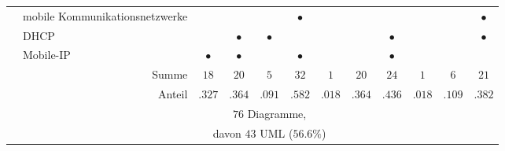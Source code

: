 \begin{mytable}
\begin{center}
\begin{longtable}{c|p{1.7cm}|ccccc|cc|cc|c}
			\multirow{3}{*}{\rotatebox{90}{$\leftarrow$~U12}} & {\raggedright mobile Kommuni\-kations\-netzwerke} & & & & $\bullet$ & & & & & & $\bullet$ \\
			\cline{2-12}
			& {\raggedright DHCP} & & $\bullet$ & $\bullet$ & & & & $\bullet$ & & & $\bullet$ \\
			\cline{2-12}
			& {\raggedright Mobile-IP} & $\bullet$ & $\bullet$ & & $\bullet$ & & & $\bullet$ & & & \\
			\midrule
			\multicolumn{2}{r|}{Summe} & $18$ & $20$ & $5$ & $32$ & $1$ & $20$ & $24$ & $1$ & $6$ & $21$ \\
			\multicolumn{2}{r|}{Anteil} & $.327$ & $.364$ & $.091$ & $.582$ & $.018$ & $.364$ & $.436$ & $.018$ & $.109$ & $.382$ \\
			\cline{3-7}
			\multicolumn{2}{c}{} & \multicolumn{5}{c}{$76$ Diagramme,} &
 \multicolumn{5}{c}{} \\
			\multicolumn{2}{c}{} & \multicolumn{5}{c}{davon $43$ UML ($56.6\%$)} &
 \multicolumn{5}{c}{} \\
		\end{longtable}
	\end{center}
	\vspace{-1.5em}
\end{mytable}


